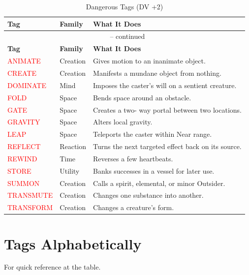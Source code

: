 \noindent
\begin{longtable}{p{} p{} p{}}
\caption{Dangerous Tags (DV +2)}\\
\midrule
\textbf{Tag} & \textbf{Family} & \textbf{What It Does}\\
\midrule
\endfirsthead
\multicolumn{3}{c}{\tablename\ \thetable{} -- continued}\\
\midrule
\textbf{Tag} & \textbf{Family} & \textbf{What It Does}\\
\midrule
\endhead
\textcolor{red}{ANIMATE} & Creation & Gives motion to an inanimate object. \\
\textcolor{red}{CREATE} & Creation & Manifests a mundane object from nothing. \\
\textcolor{red}{DOMINATE} & Mind & Imposes the caster's will on a sentient creature. \\
\textcolor{red}{FOLD} & Space & Bends space around an obstacle. \\
\textcolor{red}{GATE} & Space & Creates a two- way portal between two locations. \\
\textcolor{red}{GRAVITY} & Space & Alters local gravity. \\
\textcolor{red}{LEAP} & Space & Teleports the caster within Near range. \\
\textcolor{red}{REFLECT} & Reaction & Turns the next targeted effect back on its source. \\
\textcolor{red}{REWIND} & Time & Reverses a few heartbeats. \\
\textcolor{red}{STORE} & Utility & Banks successes in a vessel for later use. \\
\textcolor{red}{SUMMON} & Creation & Calls a spirit, elemental, or minor Outsider. \\
\textcolor{red}{TRANSMUTE} & Creation & Changes one substance into another. \\
\textcolor{red}{TRANSFORM} & Creation & Changes a creature's form. \\
\hline
\end{longtable}

\section{Tags Alphabetically}

For quick reference at the table.

